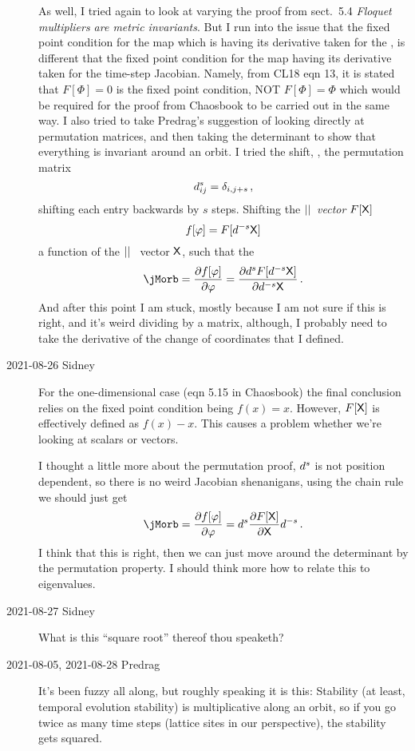 \begin{description}
As well, I tried again to look at varying the proof from
 {sect.~5.4} {\em Floquet multipliers are metric
invariants}. But I run into the issue that the fixed point condition for
the map which is having its derivative taken for the  {\jacobianOrb}, is
different that the fixed point condition for the map having its
derivative taken for the time-step Jacobian. Namely, from CL18 eqn 13, it
is stated that $F[\Phi]=0$ is the fixed point condition, NOT
$F[\Phi]=\Phi$ which would be required for the proof from Chaosbook to be
carried out in the same way. I also tried to take Predrag's suggestion of
looking directly at permutation matrices, and then taking the determinant
to show that everything is invariant around an orbit. I tried
the shift, \ie, the permutation matrix 
$$d^s_{ij}=\delta_{i,j+s}
\,,$$
shifting each entry
backwards by $s$ steps.
Shifting the ${||}$\dmn\ \emph{vector} $F[\mathsf{X}]$
$$f[\varphi]=F[d^{-s}\mathsf{X}]$$
a function of the ${||}$\dmn\  {\lattstate} vector $\mathsf{X}$, such that
the {\jacobianOrb}
\[
\jMorb=\frac{\partial f[\varphi]}{\partial \varphi}
=\frac{\partial \shift^{s}F[\shift^{-s}\Xx]}
      {\partial \shift^{-s}\Xx}
\,.
\]
And after this point I am stuck, mostly because I am not sure if this is
right, and it's weird dividing by a matrix, although, I probably need to
take the derivative of the change of coordinates that I defined.

\item[2021-08-26 Sidney]
For the one-dimensional case (eqn 5.15 in Chaosbook) the final conclusion relies on the fixed point condition being $f(x)=x$. However, $F[\mathsf{X}]$ is effectively defined as $f(x)-x$. This causes a problem whether we're looking at scalars or vectors.

I thought a little more about the permutation proof, $d^s$ is not position dependent, so there is no weird Jacobian shenanigans, using the chain rule we should just get
\[
\jMorb=\frac{\partial f[\varphi]}{\partial \varphi}
=\shift^s\frac{\partial F[\Xx]}
      {\partial \Xx}\shift^{-s}
\,.
\]
I think that this is right, then we can just move around the determinant by the permutation property. I should think more how to relate this to eigenvalues.

\item[2021-08-27 Sidney]
What is this ``square root'' thereof thou speaketh?


\item[2021-08-05, 2021-08-28 Predrag]
It's been fuzzy all along, but roughly speaking it is this:
Stability (at least, temporal evolution stability) is multiplicative
along an orbit, so if you go twice as many time steps (lattice sites in
our perspective), the stability gets squared.


\end{description}
